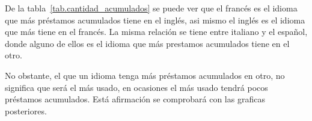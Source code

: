 De la tabla~\ref{tab.cantidad_acumulados} se puede ver que el francés es el idioma que más préstamos acumulados tiene en el inglés, asi mismo el inglés es el idioma que más tiene en el francés. La misma relación se tiene entre italiano y el español, donde alguno de ellos es el idioma que más prestamos acumulados tiene en el otro.  

No obstante, el que un idioma tenga más préstamos acumulados en otro, no significa que será el más usado, en ocasiones el más usado tendrá pocos préstamos acumulados.  Está afirmación se comprobará con las graficas posteriores. 











